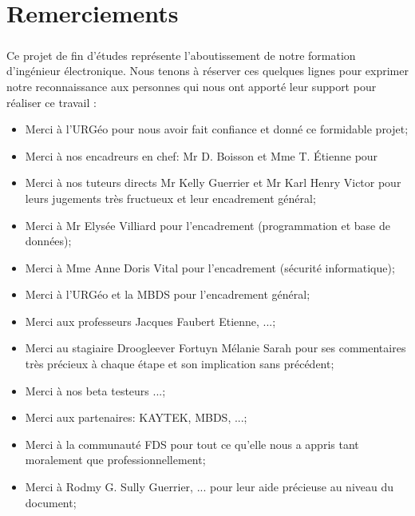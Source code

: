 \chapter*{Remerciements}
\paragraph{}
Ce projet de fin d’études représente l'aboutissement de notre formation d’ingénieur électronique. 
Nous tenons à réserver ces quelques lignes pour exprimer notre
reconnaissance aux personnes qui nous ont apporté leur support pour réaliser ce travail :

\begin{itemize}
    \item Merci à l'URGéo pour nous avoir fait confiance et donné ce formidable projet;\par
    \item Merci à nos encadreurs en chef: Mr D. Boisson et Mme T. Étienne pour \par
    \item Merci à nos tuteurs directs Mr Kelly Guerrier et Mr Karl Henry Victor pour leurs 
    jugements très fructueux et leur encadrement général;\par
    \item Merci à  Mr Elysée Villiard pour l'encadrement (programmation et base de données);\par
    \item Merci à Mme Anne Doris Vital pour l'encadrement (sécurité informatique);\par
    \item Merci à l'URGéo et la MBDS pour l'encadrement général;\par
    \item Merci aux professeurs Jacques Faubert Etienne, ...;\par
    \item Merci au stagiaire Droogleever Fortuyn Mélanie Sarah pour ses commentaires 
    très précieux à chaque étape et son implication sans précédent; \par
    \item Merci à nos beta testeurs ...;\par
    \item Merci aux partenaires: KAYTEK, MBDS, ...;\par
    \item Merci à la communauté FDS pour tout ce qu'elle nous a appris tant 
    moralement que professionnellement;\par
    \item Merci à Rodmy G. Sully Guerrier, ... pour leur aide précieuse au niveau du document; \par
\end{itemize}
